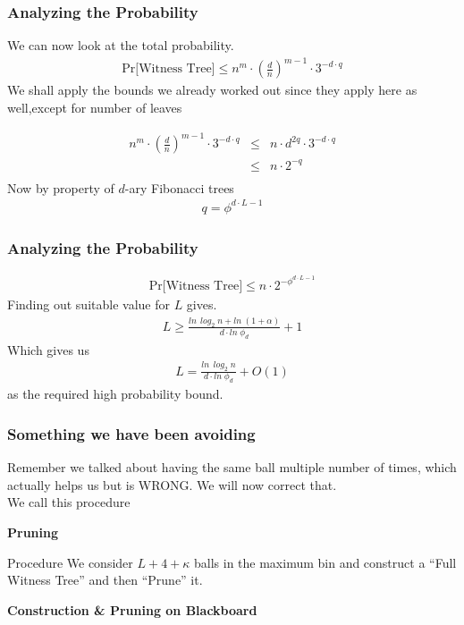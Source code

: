\documentclass{beamer}
\begin{document}
\begin{frame}
\frametitle{Analyzing the Probability}
We can now look at the total probability.
\begin{eqnarray}
 \text{Pr[Witness Tree]} \leq n^m \cdot  \left( \frac{d}{n} \right) ^{m-1} \cdot 3^{-d\cdot q}
\end{eqnarray}
We shall apply the bounds we already worked out since they apply here as well,except for number of leaves

\begin{eqnarray}
 n^m \cdot  \left( \frac{d}{n} \right) ^{m-1} \cdot 3^{-d\cdot q} & \leq & n \cdot d ^{2q} \cdot 3^{-d \cdot q} \\
& \leq & n \cdot 2^{-q} \\
\end{eqnarray} 
Now by property of $d$-ary Fibonacci trees
\begin{eqnarray}
 q = \phi^{d \cdot L -1}  
\end{eqnarray}
\end{frame}

\begin{frame}

\frametitle{Analyzing the Probability}
\begin{eqnarray}
 \text{Pr[Witness Tree]} \leq n \cdot 2^{-\phi^{d \cdot L -1} }
\end{eqnarray}
Finding out suitable value for $L$ gives. 
\begin{eqnarray}
L \geq \frac{ln \, \; log_2 \; n + ln \; (1+ \alpha)}{d \cdot ln \; \phi_d} +1 
\end{eqnarray}
Which gives us 
\begin{eqnarray}
L = \frac{ln \, \; log_2 \; n}{d \cdot ln \; \phi_d} +O(1) 
\end{eqnarray}
as the required high probability bound. 
\end{frame}
 
\begin{frame}
 \frametitle{Something we have been avoiding}
Remember we talked about having the same ball multiple number of times, which actually helps us but is WRONG. We will now correct that. \\
We call this procedure 
\begin{center}
 \textbf{Pruning}
\end{center}
\begin{block}
 {Procedure}
We consider $L+4+ \kappa$ balls in the maximum bin and construct a ``Full Witness Tree'' and then ``Prune'' it. 
\end{block}
\begin{center}
 \textbf{Construction \& Pruning on Blackboard}
\end{center}
\end{frame}
\end{document}
